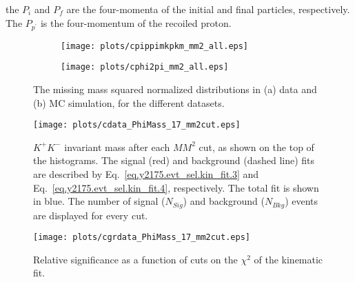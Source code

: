 \noindent the $P_i$ and $P_f$ are the four-momenta of the initial and final particles, respectively. The $P_{p^{\prime}}$ is the four-momentum of the recoiled proton.

\begin{figure}[H]
    \centering
    \begin{subfigure}[b]{0.5\textwidth}
        \texttt{[image: plots/cpippimkpkm\_mm2\_all.eps]}
        \caption{}
        \label{fig.y2175.evt_sel.mis_mass_sqrt.1.a}
    \end{subfigure}\hfill
    \begin{subfigure}[b]{0.5\textwidth}
        \texttt{[image: plots/cphi2pi\_mm2\_all.eps]}
        \caption{}
        \label{fig.y2175.evt_sel.mis_mass_sqrt.1.b}
    \end{subfigure}
    \caption{The missing mass squared normalized distributions in (a) data and (b) MC simulation, for the different datasets.}
    \label{fig.y2175.evt_sel.mis_mass_sqrt.1}
\end{figure}

\begin{figure}[H]
    \centering
        \texttt{[image: plots/cdata\_PhiMass\_17\_mm2cut.eps]}
        \caption{$K^+K^-$ invariant mass after each $MM^2$ cut, as shown on the top of the histograms. The signal (red) and background (dashed line) fits are described by Eq.~\ref{eq.y2175.evt_sel.kin_fit.3} and Eq.~\ref{eq.y2175.evt_sel.kin_fit.4}, respectively. The total fit is shown in blue. The number of signal ($N_{Sig}$) and background ($N_{Bkg}$) events are displayed for every cut.}
        \label{fig.y2175.evt_sel.mis_mass_sqrt.2}
\end{figure}

\begin{figure}[H]
    \centering
        \texttt{[image: plots/cgrdata\_PhiMass\_17\_mm2cut.eps]}
        \caption{Relative significance as a function of cuts on the $\chi^{2}$ of the kinematic fit.}
        \label{fig.y2175.evt_sel.mis_mass_sqrt.3}
\end{figure}

